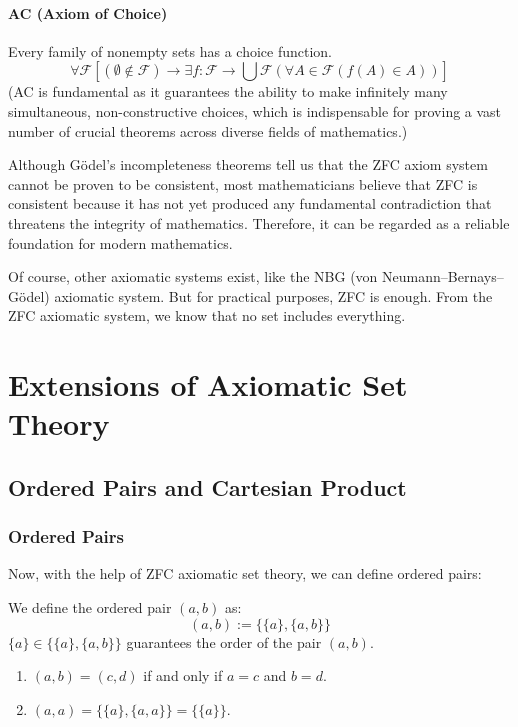 \paragraph{AC (Axiom of Choice)}
Every family of nonempty sets has a choice function.
$$ \forall \mathcal{F} [(\emptyset \notin \mathcal{F}) \to \exists f: \mathcal{F} \to \bigcup \mathcal{F} (\forall A \in \mathcal{F} (f(A) \in A))] $$
(AC is fundamental as it guarantees the ability to make infinitely many simultaneous, non-constructive choices, which is indispensable for proving a vast number of crucial theorems across diverse fields of mathematics.)

Although Gödel's incompleteness theorems tell us that the ZFC axiom system cannot be proven to be consistent, most mathematicians believe that ZFC is consistent because it has not yet produced any fundamental contradiction that threatens the integrity of mathematics. Therefore, it can be regarded as a reliable foundation for modern mathematics.

Of course, other axiomatic systems exist, like the NBG (von Neumann–Bernays–Gödel) axiomatic system. But for practical purposes, ZFC is enough. From the ZFC axiomatic system, we know that no set includes everything.

\section{Extensions of Axiomatic Set Theory}

\subsection{Ordered Pairs and Cartesian Product}

\subsubsection{Ordered Pairs}
Now, with the help of ZFC axiomatic set theory, we can define ordered pairs:
\begin{definition}
We define the ordered pair $(a,b)$ as:
$$ (a,b) := \{\{a\}, \{a,b\}\} $$
$\{a\} \in \{\{a\}, \{a,b\}\}$ guarantees the order of the pair $(a,b)$.
\end{definition}

\begin{inference}
\begin{enumerate}
\item $(a,b) = (c,d)$ if and only if $a=c$ and $b=d$.

\item $(a,a) = \{\{a\}, \{a,a\}\} = \{\{a\}\}$.
\end{enumerate}
\end{inference}

